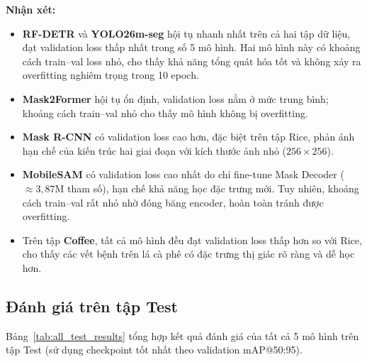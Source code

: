 \textbf{Nhận xét:}
\begin{itemize}
    \item \textbf{RF-DETR} và \textbf{YOLO26m-seg} hội tụ nhanh nhất trên cả hai tập dữ liệu, đạt validation loss thấp nhất trong số 5 mô hình. Hai mô hình này có khoảng cách train--val loss nhỏ, cho thấy khả năng tổng quát hóa tốt và không xảy ra overfitting nghiêm trọng trong 10 epoch.
    \item \textbf{Mask2Former} hội tụ ổn định, validation loss nằm ở mức trung bình; khoảng cách train--val nhỏ cho thấy mô hình không bị overfitting.
    \item \textbf{Mask R-CNN} có validation loss cao hơn, đặc biệt trên tập Rice, phản ánh hạn chế của kiến trúc hai giai đoạn với kích thước ảnh nhỏ ($256 \times 256$).
    \item \textbf{MobileSAM} có validation loss cao nhất do chỉ fine-tune Mask Decoder ($\approx 3,87$M tham số), hạn chế khả năng học đặc trưng mới. Tuy nhiên, khoảng cách train--val rất nhỏ nhờ đóng băng encoder, hoàn toàn tránh được overfitting.
    \item Trên tập \textbf{Coffee}, tất cả mô hình đều đạt validation loss thấp hơn so với Rice, cho thấy các vết bệnh trên lá cà phê có đặc trưng thị giác rõ ràng và dễ học hơn.
\end{itemize}

\subsection{Đánh giá trên tập Test}
\label{subsec:test_results}

Bảng~\ref{tab:all_test_results} tổng hợp kết quả đánh giá của tất cả 5 mô hình trên tập Test (sử dụng checkpoint tốt nhất theo validation mAP@50:95).

